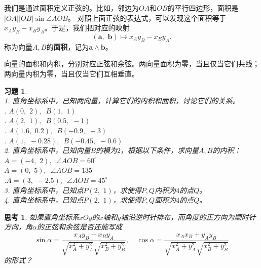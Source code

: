 \documentclass[12pt,UTF8]{ctexbook}
\newtheorem{sk}{思考}[section]
\newtheorem{xt}{习题}[section]
\begin{document}

我们是通过面积定义正弦的。比如，邻边为$OA$和$OB$的平行四边形，面积是$|OA||OB|\sin \angle AOB$。
对照上面正弦的表达式，可以发现这个面积等于$x_Ay_B - x_By_A$。于是，我们把对应的映射
$$ (\mathbf{a}, \,\,\mathbf{b}) \mapsto x_Ay_B - x_By_A. $$
称为向量$A, B$的\textbf{面积}，记为$\mathbf{a} \wedge \mathbf{b}$。

向量的面积和内积，分别对应正弦和余弦。两向量面积为零，当且仅当它们共线；两向量内积为零，当且仅当它们互相垂直。

\begin{xt}
    \mbox{} \\
    1. 直角坐标系中，已知两向量，计算它们的内积和面积，讨论它们的关系。\\
    . $A(0,\,\, 2), \,\,\, B(1, \,\,1)$ \\
    . $A(2,\,\, 1),\,\,\,  B(0.5, \,\,-1)$ \\
    . $A(1.6,\,\, 0.2), \,\,\, B(-0.9,\,\, -3)$\\
    . $A(1, \,\,-0.28), \,\,\, B(-0.45,\,\, -0.6)$\\
    2. 直角坐标系中，已知向量$B$的模为$2$，根据以下条件，求向量$A,B$的内积：\\
     $A = (-4, \,\,2), \,\,\, \angle AOB = 60^\circ$\\
     $A= (0,\,\, 5), \,\,\,\angle AOB = 135^\circ$\\
    .$A = (3,\,\, -2.5), \,\,\,\angle AOB = 45^\circ$\\
    3. 直角坐标系中，已知点$P(2,\,\,1)$，求使得$P,Q$内积为$4$的点$Q$。\\
    4. 直角坐标系中，已知点$P(2,\,\,1)$，求使得$P,Q$面积为$4$的点$Q$。
\end{xt}

\begin{sk}
    如果直角坐标系$xOy$的$x$轴和$y$轴沿逆时针排布，而角度的正方向为顺时针方向，角$\alpha$的正弦和余弦是否还能写成
    $$ \sin \alpha = \frac{x_Ay_B - x_By_A}{\sqrt{x_A^2 + y_A^2}\sqrt{x_B^2 + y_B^2}}, \quad \cos \alpha = \frac{x_Ax_B + y_Ay_B}{\sqrt{x_A^2 + y_A^2} \sqrt{x_B^2 + y_B^2}}$$
    的形式？
\end{sk}
\end{document}
